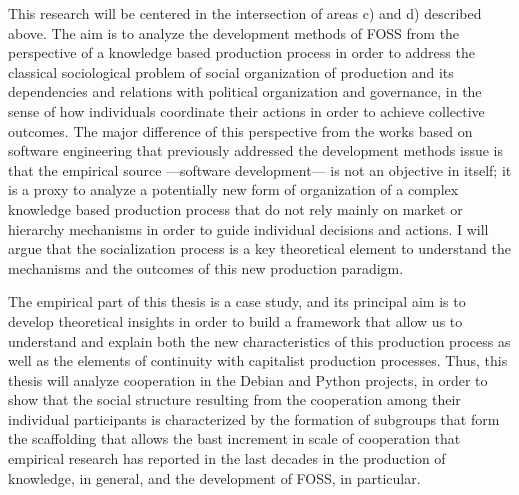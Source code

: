 This research will be centered in the intersection of areas c) and d) described above. The aim is to analyze the development methods of FOSS from the perspective of a knowledge based production process in order to address the classical sociological problem of social organization of production and its dependencies and relations with political organization and governance, in the sense of how individuals coordinate their actions in order to achieve collective outcomes. The major difference of this perspective from the works based on software engineering that previously addressed the development methods issue is that the empirical source ---software development--- is not an objective in itself; it is a proxy to analyze a potentially new form of organization of a complex knowledge based production process that do not rely mainly on market or hierarchy mechanisms in order to guide individual decisions and actions. I will argue that the socialization process is a key theoretical element to understand the mechanisms and the outcomes of this new production paradigm.

The empirical part of this thesis is a case study, and its principal aim is to develop theoretical insights in order to build a framework that allow us to understand and explain both the new characteristics of this production process as well as the elements of continuity with capitalist production processes. Thus, this thesis will analyze cooperation in the Debian and Python projects, in order to show that the social structure resulting from the cooperation among their individual participants is characterized by the formation of subgroups that form the scaffolding that allows the bast increment in scale of cooperation that empirical research has reported in the last decades in the production of knowledge, in general, and the development of FOSS, in particular.

